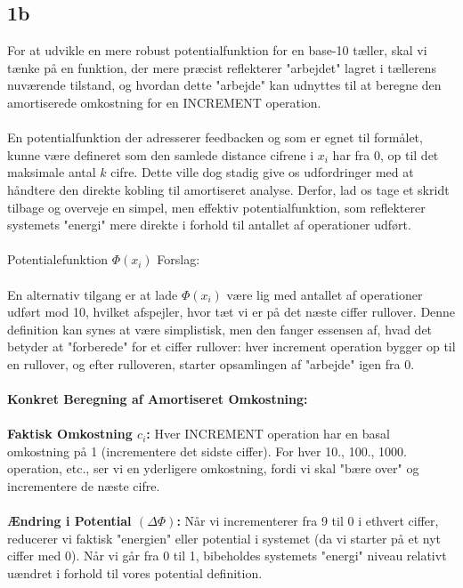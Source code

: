 \documentclass{article}
\begin{document}
\subsection{1b}
For at udvikle en mere robust potentialfunktion for en base-10 tæller, skal vi tænke på en funktion, der mere præcist reflekterer "arbejdet" lagret i tællerens nuværende tilstand, og hvordan dette "arbejde" kan udnyttes til at beregne den amortiserede omkostning for en INCREMENT operation.
\\
\\
En potentialfunktion der adresserer feedbacken og som er egnet til formålet, kunne være defineret som den samlede distance cifrene i $x_i$ har fra 0, op til det maksimale antal $k$ cifre. Dette ville dog stadig give os udfordringer med at håndtere den direkte kobling til amortiseret analyse. Derfor, lad os tage et skridt tilbage og overveje en simpel, men effektiv potentialfunktion, som reflekterer systemets "energi" mere direkte i forhold til antallet af operationer udført.
\\
\\
Potentialefunktion $\Phi(x_i)$ Forslag:
\\
\\
En alternativ tilgang er at lade $\Phi(x_i)$ være lig med antallet af operationer udført mod 10, hvilket afspejler, hvor tæt vi er på det næste ciffer rullover. Denne definition kan synes at være simplistisk, men den fanger essensen af, hvad det betyder at "forberede" for et ciffer rullover: hver increment operation bygger op til en rullover, og efter rulloveren, starter opsamlingen af "arbejde" igen fra 0.
\\
\\
\textbf{Konkret Beregning af Amortiseret Omkostning:}
\\
\\
\textbf{Faktisk Omkostning $c_i$:} Hver INCREMENT operation har en basal omkostning på 1 (incrementere det sidste ciffer). For hver 10., 100., 1000. operation, etc., ser vi en yderligere omkostning, fordi vi skal "bære over" og incrementere de næste cifre.
\\
\\
\textbf{Ændring i Potential $(\Delta\Phi)$:} Når vi incrementerer fra 9 til 0 i ethvert ciffer, reducerer vi faktisk "energien" eller potential i systemet (da vi starter på et nyt ciffer med 0). Når vi går fra 0 til 1, bibeholdes systemets "energi" niveau relativt uændret i forhold til vores potential definition.
\\
\\
\end{document}
